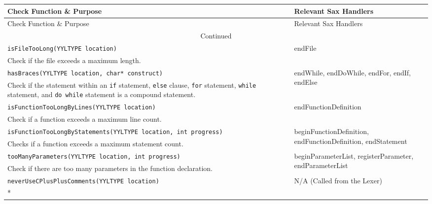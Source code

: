 \documentclass[12pt]{report}
\begin{document}
\begin{longtable}{p{9.5cm} p{\saxColSize}}
\toprule
Check Function \& Purpose & Relevant Sax Handlers \\ \midrule
\endfirsthead
\toprule
Check Function \& Purpose & Relevant Sax Handlers \\ \midrule
\endhead
\hline
\multicolumn{2}{c}{Continued}\\
\bottomrule
\endfoot
\bottomrule
\endlastfoot

		\lstinline!isFileTooLong(YYLTYPE location)! & \multirow{2}{\saxColSize}{endFile} \\*
			 Check if the file exceeds a maximum length.  \vspace{\vertSize} \\
		\lstinline!hasBraces(YYLTYPE location, char* construct)! & \multirow{2}{\saxColSize}{endWhile, endDoWhile, endFor, endIf, endElse} \\*
			 Check if the statement within an \lstinline!if! statement, \lstinline!else! clause, \lstinline!for! statement, \lstinline!while! statement, and \lstinline!do while! statement is a compound statement. \vspace{\vertSize} \\
		\lstinline!isFunctionTooLongByLines(YYLTYPE location)! & \multirow{2}{\saxColSize}{endFunctionDefinition} \\*
			 Check if a function exceeds a maximum line count. \vspace{\vertSize} \\
		\lstinline!isFunctionTooLongByStatements(YYLTYPE location, int progress)! & \multirow{2}{\saxColSize}{beginFunctionDefinition, endFunctionDefinition, endStatement} \\*
			 Checks if a function exceeds a maximum statement count. \vspace{\vertSize} \\
		\lstinline!tooManyParameters(YYLTYPE location, int progress)! & \multirow{2}{\saxColSize}{beginParameterList, registerParameter, endParameterList} \\*
			 Check if there are too many parameters in the function declaration. \vspace{\vertSize} \\
		\lstinline!neverUseCPlusPlusComments(YYLTYPE location)! & \multirow{2}{\saxColSize}{N/A (Called from the Lexer)} \\ *

\end{longtable}
\end{document}
